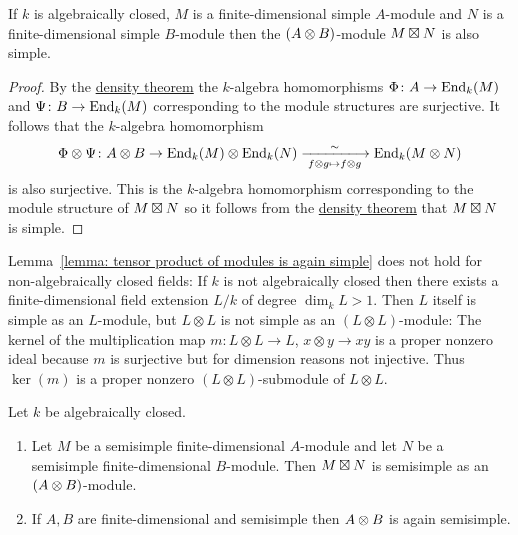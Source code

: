 \begin{lemma}
  \label{lemma: tensor product of modules is again simple}
  If $k$ is algebraically closed, $M$ is a finite-dimensional simple $A$-module and $N$ is a finite-dimensional simple $B$-module then the $(A \mathbin{\otimes} B)$-module $M \mathbin{\boxtimes} N$ is also simple.
\end{lemma}


\begin{proof}
  By the \hyperref[theorem: density theorem]{density theorem} the $k$-algebra homomorphisms $\Phi \colon A \to \operatorname{End}_k(M)$ and $\Psi \colon B \to \operatorname{End}_k(M)$ corresponding to the module structures are surjective.
  It follows that the $k$-algebra homomorphism
  \[
            \Phi \tensor \Psi
    \colon  A \tensor B
    \to     \End_k(M) \tensor \End_k(N)
    \xlongrightarrow[\;f \tensor g \mapsto f \tensor g\;]{\sim} 
            \End_k(M \tensor N)
  \]
  is also surjective.
  This is the $k$-algebra homomorphism corresponding to the module structure of $M \mathbin{\boxtimes} N$ so it follows from the \hyperref[theorem: density theorem]{density theorem} that $M \mathbin{\boxtimes} N$ is simple.
\end{proof}


\begin{warning}
  Lemma~\ref{lemma: tensor product of modules is again simple} does not hold for non-algebraically closed fields:
  If $k$ is not algebraically closed then there exists a finite-dimensional field extension $L/k$ of degree $\dim_k L > 1$.
  Then $L$ itself is simple as an $L$-module, but $L \otimes L$ is not simple as an $(L \otimes L)$-module:
  The kernel of the multiplication map $m \colon L \otimes L \to L$, $x \otimes y \to xy$ is a proper nonzero ideal because $m$ is surjective but for dimension reasons not injective.
  Thus $\ker(m)$ is a proper nonzero $(L \otimes L)$-submodule of $L \otimes L$.
\end{warning}


\begin{corollary}
  Let $k$ be algebraically closed.
  \begin{enumerate}
    \item
      \label{enumerate: outer tensor product of semisimple modules}
      Let $M$ be a semisimple finite-dimensional $A$-module and let $N$ be a semisimple finite-dimensional $B$-module.
      Then $M \mathbin{\boxtimes} N$ is semisimple as an $(A \mathbin{\otimes} B)$-module.
    \item
      If $A, B$ are finite-dimensional and semisimple then $A \mathbin{\otimes} B$ is again semisimple.
  \end{enumerate}
\end{corollary}


